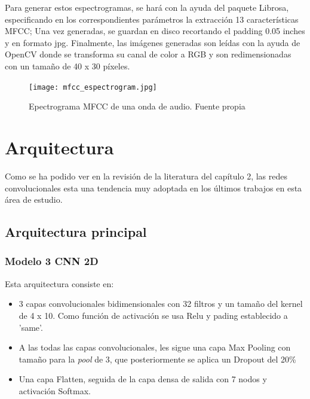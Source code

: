 \documentclass[11pt,a4paper,spanish]{book}
\begin{document}
	Para generar estos espectrogramas, se hará con la ayuda del paquete Librosa, especificando en los correspondientes parámetros la extracción 13 características MFCC; Una vez generadas, se guardan en disco recortando el padding 0.05 inches y en formato jpg.
	Finalmente, las imágenes generadas son leídas con la ayuda de OpenCV donde se transforma su canal de color a RGB y son redimensionadas con un tamaño de 40 x 30 píxeles.
	
	\begin{figure}[H]
		\centering
		\texttt{[image: mfcc\_espectrogram.jpg]} 
		\caption{Epectrograma MFCC de una onda de audio. Fuente propia}
		\label{fig:mfcc_sample}
	\end{figure}
	
	
	\section{Arquitectura}
	\label{sec:arquitectura_cap4}
	Como se ha podido ver en la revisión de la literatura del capítulo 2, las redes convolucionales esta una tendencia muy adoptada en los últimos trabajos en esta área de estudio.
	
	
	\subsection{Arquitectura principal}
		\subsubsection{Modelo 3 CNN 2D}
		\label{cap4:Modelo3}
		Esta arquitectura consiste en:
		\begin{itemize}
			\item 3 capas convolucionales bidimensionales con 32 filtros y un tamaño del kernel de 4 x 10. Como función de activación se usa Relu y pading establecido a 'same'.
			
			\item A las todas las capas convolucionales, les sigue una capa Max Pooling con tamaño para la \emph{pool} de 3, que posteriormente se aplica un Dropout del 20\%
			
			\item Una capa Flatten, seguida de la capa densa de salida con 7 nodos y activación Softmax.
		\end{itemize}
		
\end{document}
